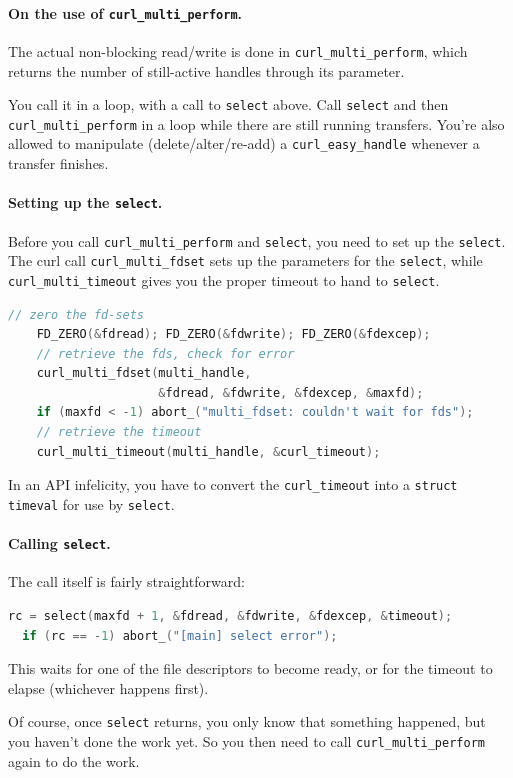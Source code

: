 \paragraph{On the use of {\tt curl\_multi\_perform}.} The actual non-blocking read/write
is done in {\tt curl\_multi\_perform}, which returns the number of still-active handles 
through its parameter.

You call it in a loop, with a call to {\tt select} above. Call {\tt select} and then
{\tt curl\_multi\_perform} in a loop while there are still running transfers.
You're also allowed to manipulate (delete/alter/re-add) a {\tt curl\_easy\_handle} whenever
a transfer finishes.

\paragraph{Setting up the {\tt select}.} Before you call {\tt curl\_multi\_perform}
and {\tt select}, you need to set up the {\tt select}. The curl call {\tt curl\_multi\_fdset}
sets up the parameters for the {\tt select}, while {\tt curl\_multi\_timeout} gives you
the proper timeout to hand to {\tt select}.

\begin{lstlisting}[language=C]
    // zero the fd-sets
    FD_ZERO(&fdread); FD_ZERO(&fdwrite); FD_ZERO(&fdexcep);
    // retrieve the fds, check for error
    curl_multi_fdset(multi_handle, 
                     &fdread, &fdwrite, &fdexcep, &maxfd);
    if (maxfd < -1) abort_("multi_fdset: couldn't wait for fds");
    // retrieve the timeout
    curl_multi_timeout(multi_handle, &curl_timeout);
\end{lstlisting}

In an API infelicity, you have to convert the {\tt curl\_timeout} into a
{\tt struct timeval} for use by {\tt select}.

\paragraph{Calling {\tt select}.}
The call itself is fairly straightforward:
\begin{lstlisting}[language=C]
  rc = select(maxfd + 1, &fdread, &fdwrite, &fdexcep, &timeout);
  if (rc == -1) abort_("[main] select error");
\end{lstlisting}
This waits for one of the file descriptors to become ready, or for the
timeout to elapse (whichever happens first).

Of course, once {\tt select} returns, you only know that something
happened, but you haven't done the work yet. So you then need to call
{\tt curl\_multi\_perform} again to do the work.

